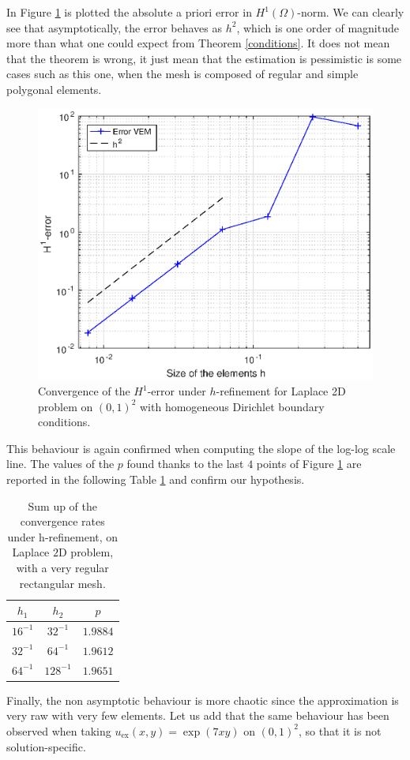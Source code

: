 In Figure \ref{img:conv2d} is plotted the absolute a priori error in $H^1(\Omega)$-norm. We can clearly see that asymptotically, the error behaves as $h^2$, which is one order of magnitude more than what one could expect from Theorem \ref{conditions}. It does not mean that the theorem is wrong, it just mean that the estimation is pessimistic is some cases such as this one, when the mesh is composed of regular and simple polygonal elements. 

\begin{figure}[!h]
\centering
\includegraphics[scale=0.8]{images/convergencePlot2D.eps}
\caption{Convergence of the $H^1$-error under $h$-refinement for Laplace 2D problem on $(0,1)^2$ with homogeneous Dirichlet boundary conditions.}
\label{img:conv2d}
\end{figure}
This behaviour is again confirmed when computing the slope of the log-log scale line. The values of the $p$ found thanks to the last $4$ points of Figure \ref{img:conv2d} are reported in the following Table \ref{tableRect} and confirm our hypothesis.
\begin{table}[h!]
\begin{center}
\begin{tabular}{|c|c|c|}
\hline
$h_1$ & $h_2$ & $p$ \\
\hline
$16^{-1}$ & $32^{-1}$ & $1.9884$\\
\hline
$32^{-1}$ & $64^{-1}$ & $1.9612$\\
\hline
$64^{-1}$ & $128^{-1}$ & $1.9651$\\
\hline
\end{tabular}
\end{center}
\caption{Sum up of the convergence rates under h-refinement, on Laplace $2$D problem, with a very regular rectangular mesh.} \label{tableRect}
\end{table}
Finally, the non asymptotic behaviour is more chaotic since the approximation is very raw with very few elements. Let us add that the same behaviour has been observed when taking $u_\text{ex}(x,y)=\exp(7xy)$ on $(0,1)^2$, so that it is not solution-specific.\\

